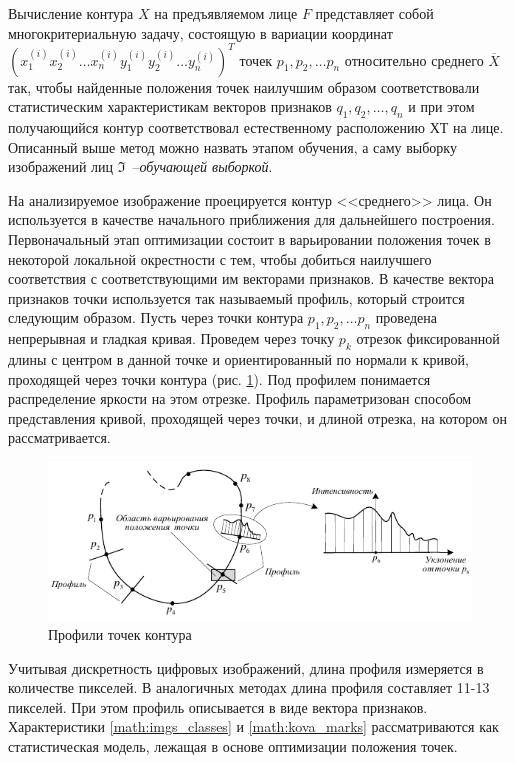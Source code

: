 Вычисление контура 
$\mathit{X}$ на предъявляемом лице 
$F$ представляет собой многокритериальную задачу, состоящую в вариации координат
$(x^{(i)}_1  x^{(i)}_2  \dots x^{(i)}_n   y^{(i)}_1  y^{(i)}_2  \dots y^{(i)}_n)^T$
точек $p_1, p_2, \dots p_n$ относительно среднего $\mathit{\overline{X}}$ так, чтобы найденные положения точек 
наилучшим образом соответствовали статистическим характеристикам векторов признаков $q_1, q_2, \dots, q_n$
и при этом получающийся контур соответствовал естественному расположению ХТ на лице. Описанный выше метод можно назвать этапом
обучения, а саму выборку изображений лиц $\Im$~--\textit{обучающей выборкой}.

На анализируемое изображение проецируется контур 
<<среднего>> лица. Он используется в качестве начального приближения для дальнейшего построения. Первоначальный этап 
оптимизации состоит в варьировании положения точек в некоторой локальной окрестности с тем, чтобы добиться наилучшего 
соответствия с соответствующими им векторами признаков. В 
качестве вектора признаков точки используется так называемый 
профиль, который строится следующим образом. Пусть через 
точки контура $p_1, p_2, \dots p_n$ проведена непрерывная и гладкая 
кривая. Проведем через точку $p_k$ отрезок фиксированной длины 
с центром в данной точке и ориентированный по нормали к кривой, проходящей через точки контура (рис. \ref{fig:contur}).
Под профилем 
понимается распределение яркости на этом отрезке. Профиль 
параметризован способом представления кривой, проходящей 
через точки, и длиной отрезка, на котором он рассматривается.

\begin{figure}[hbt!]
    \centering
    \includegraphics{contur.png}
    \caption{Профили точек контура}
    \label{fig:contur}
\end{figure}

Учитывая дискретность цифровых изображений, длина 
профиля измеряется в количестве пикселей. В аналогичных методах \cite{milborrow} длина профиля составляет 11-13 пикселей. При этом 
профиль описывается в виде вектора признаков. Характеристики \ref{math:imgs_classes} и \ref{math:kova_marks} рассматриваются как
статистическая модель, лежащая в основе оптимизации положения точек. 

